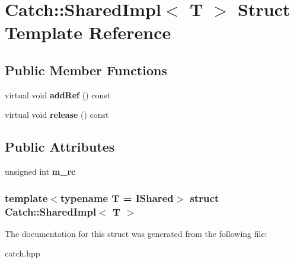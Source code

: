 \hypertarget{structCatch_1_1SharedImpl}{
\section{Catch::SharedImpl$<$ T $>$ Struct Template Reference}
\label{structCatch_1_1SharedImpl}
}
\subsection*{Public Member Functions}
\begin{DoxyCompactItemize}
\item 
\hypertarget{structCatch_1_1SharedImpl_a9b190b7a139a09d2624d1201d8e4f87e}{
virtual void {\bfseries addRef} () const }
\label{structCatch_1_1SharedImpl_a9b190b7a139a09d2624d1201d8e4f87e}

\item 
\hypertarget{structCatch_1_1SharedImpl_a16baad80ad5ad3dfaf2a10a157a02e01}{
virtual void {\bfseries release} () const }
\label{structCatch_1_1SharedImpl_a16baad80ad5ad3dfaf2a10a157a02e01}

\end{DoxyCompactItemize}
\subsection*{Public Attributes}
\begin{DoxyCompactItemize}
\item 
\hypertarget{structCatch_1_1SharedImpl_a7e71ef1985b85aa41a1632f932a96bcb}{
unsigned int {\bfseries m\_\-rc}}
\label{structCatch_1_1SharedImpl_a7e71ef1985b85aa41a1632f932a96bcb}

\end{DoxyCompactItemize}
\subsubsection*{template$<$typename T = IShared$>$ struct Catch::SharedImpl$<$ T $>$}



The documentation for this struct was generated from the following file:\begin{DoxyCompactItemize}
\item 
catch.hpp\end{DoxyCompactItemize}
